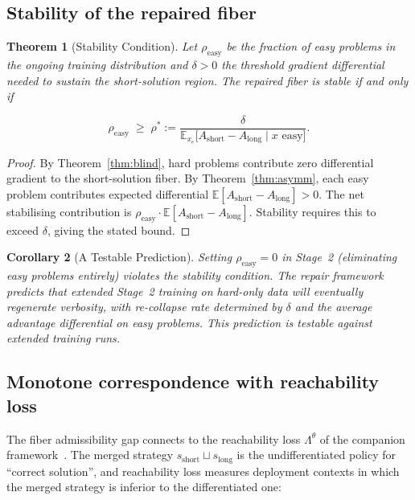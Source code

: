\documentclass[11pt]{article}
\theoremstyle{rthm}
\newtheorem{theorem}{Theorem}[section]
\newtheorem{corollary}[theorem]{Corollary}
\theoremstyle{rdef}
\theoremstyle{remark}
\begin{document}
\subsection{Stability of the repaired fiber}

\begin{theorem}[Stability Condition]
\label{thm:stable}
Let $\rho_{\mathrm{easy}}$ be the fraction of easy problems in the
ongoing training distribution and $\delta > 0$ the threshold
gradient differential needed to sustain the short-solution region.
The repaired fiber is stable if and only if

\[
\rho_{\mathrm{easy}} \;\geq\; \rho^* :=
\frac{\delta}{\mathbb{E}_{x_e}\bigl[A_{\mathrm{short}}
- A_{\mathrm{long}} \mid x \text{ easy}\bigr]}.
\]
\end{theorem}

\begin{proof}
By Theorem~\ref{thm:blind}, hard problems contribute zero
differential gradient to the short-solution fiber. By
Theorem~\ref{thm:asymm}, each easy problem contributes expected
differential $\mathbb{E}[A_{\mathrm{short}} - A_{\mathrm{long}}]
> 0$. The net stabilising contribution is $\rho_{\mathrm{easy}}
\cdot \mathbb{E}[A_{\mathrm{short}} - A_{\mathrm{long}}]$.
Stability requires this to exceed $\delta$, giving the stated
bound.
\end{proof}

\begin{corollary}[A Testable Prediction]
\label{cor:prediction}
Setting $\rho_{\mathrm{easy}} = 0$ in Stage~2 (eliminating easy
problems entirely) violates the stability condition. The repair
framework predicts that extended Stage~2 training on hard-only
data will eventually regenerate verbosity, with re-collapse rate
determined by $\delta$ and the average advantage differential on
easy problems. This prediction is testable against extended
training runs.
\end{corollary}

\subsection{Monotone correspondence with reachability loss}

The fiber admissibility gap connects to the reachability loss
$\Lambda^\theta$ of the companion framework~\cite{flyxion2026}.
The merged strategy $s_{\mathrm{short}} \sqcup s_{\mathrm{long}}$
is the undifferentiated policy for ``correct solution'', and
reachability loss measures deployment contexts in which the merged
strategy is inferior to the differentiated one:
\end{document}
